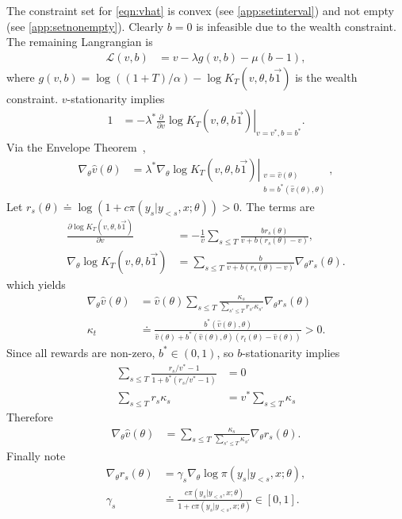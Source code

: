 \documentclass{article}
\begin{document}
The constraint set for \cref{eqn:vhat} is convex (see \cref{app:setinterval}) and not empty (see \cref{app:setnonempty}).
Clearly $b = 0$ is infeasible due to the wealth constraint.  The remaining Langrangian is
\begin{align*}
\mathcal{L}(v, b) &= v - \lambda g(v, b) - \mu (b - 1),
\end{align*}
where $g(v, b) = \log((1+T)/\alpha) - \log K_T(v, \theta, b \vec{1})$ is the wealth constraint.  $v$-stationarity implies
\begin{align*}
1 &= -\lambda^* \left. \frac{\partial}{\partial v} \log K_T(v, \theta, b \vec{1}) \right|_{v=v^*,b=b^*}.
\end{align*}
Via the Envelope Theorem~\parencite{mwg1995},
\begin{align*}
\nabla_\theta \hat{v}(\theta) &= \lambda^* \left.\nabla_\theta \log K_T(v, \theta, b \vec{1}) \right|_{\substack{v=\hat{v}(\theta) \\ b = b^*(\hat{v}(\theta), \theta)}},
\end{align*}
Let $r_s(\theta) \doteq \log(1 + c \pi(y_s|y_{<s},x;\theta)) > 0$.
The terms are
\begin{align*}
\frac{\partial \log K_T\left(v, \theta, b \vec{1}\right)}{\partial v} &= -\frac{1}{v}  \sum_{s \leq T} \frac{b r_s(\theta)}{v + b \left(r_s(\theta) - v\right)}, \\
\nabla_\theta \log K_T\left(v, \theta, b \vec{1}\right) &= \sum_{s \leq T} \frac{b}{v + b \left(r_s(\theta) - v\right)} \nabla_\theta r_s(\theta).
\end{align*}
which yields
\begin{align*}
\nabla_\theta \hat{v}(\theta) &= \hat{v}(\theta) \sum_{s \leq T} \frac{\kappa_s}{\sum_{s' \leq T} r_{s'} \kappa_{s'}} \nabla_\theta r_s(\theta) \\
\kappa_t &\doteq \frac{b^*(\hat{v}(\theta), \theta)}{\hat{v}(\theta) + b^*(\hat{v}(\theta), \theta) \left(r_t(\theta) - \hat{v}(\theta) \right)} > 0.
\end{align*}
Since all rewards are non-zero, $b^* \in (0, 1)$, so $b$-stationarity implies
\begin{align*}
\sum_{s \leq T} \frac{r_s / v^* - 1}{1 + b^* (r_s / v^* - 1)} &= 0 \\
\sum_{s \leq T} r_s \kappa_s &= v^* \sum_{s \leq T} \kappa_s
\end{align*}
Therefore
\begin{align*}
\nabla_\theta \hat{v}(\theta) &= \sum_{s \leq T} \frac{\kappa_s}{\sum_{s' \leq T} \kappa_{s'}} \nabla_\theta r_s(\theta).
\end{align*}
Finally note
\begin{align*}
\nabla_\theta r_s(\theta) &= \gamma_s \nabla_\theta \log \pi\left(y_s|y_{<s},x;\theta\right), \\
\gamma_s &\doteq \frac{c \pi\left(y_s|y_{<s},x;\theta\right)}{1 + c \pi\left(y_s|y_{<s},x;\theta\right)} \in [0, 1].
\end{align*}
\end{document}
